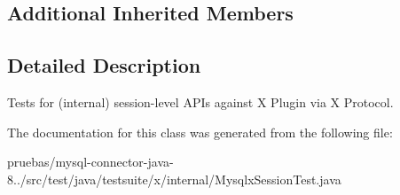 \subsection*{Additional Inherited Members}


\subsection{Detailed Description}
Tests for (internal) session-\/level A\+P\+Is against X Plugin via X Protocol. 

The documentation for this class was generated from the following file\+:\begin{DoxyCompactItemize}
\item 
pruebas/mysql-\/connector-\/java-\/8../src/test/java/testsuite/x/internal/Mysqlx\+Session\+Test.\+java\end{DoxyCompactItemize}
